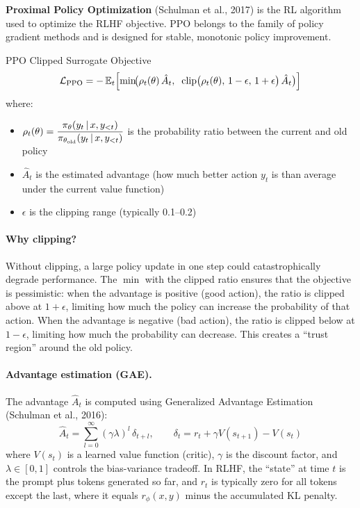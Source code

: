 \textbf{Proximal Policy Optimization} (Schulman et al., 2017) is the RL
algorithm used to optimize the RLHF objective.  PPO belongs to the family
of policy gradient methods and is designed for stable, monotonic policy
improvement.

\begin{mathresult}{PPO Clipped Surrogate Objective}
\begin{equation}
\mathcal{L}_{\text{PPO}} = -\operatorname{\mathbb{E}}_t \Bigl[
  \min\!\bigl(
    \rho_t(\theta)\, \hat{A}_t,\;\;
    \text{clip}\bigl(\rho_t(\theta),\, 1-\epsilon,\, 1+\epsilon\bigr)\, \hat{A}_t
  \bigr)
\Bigr]
\label{eq:ppo}
\end{equation}
where:
\begin{itemize}
\item $\rho_t(\theta) = \dfrac{\pi_\theta(y_t \,|\, x, y_{<t})}
  {\pi_{\theta_{\text{old}}}(y_t \,|\, x, y_{<t})}$ is the probability
  ratio between the current and old policy
\item $\hat{A}_t$ is the estimated advantage (how much better action $y_t$
  is than average under the current value function)
\item $\epsilon$ is the clipping range (typically 0.1--0.2)
\end{itemize}
\end{mathresult}

\paragraph{Why clipping?}
Without clipping, a large policy update in one step could catastrophically
degrade performance.  The $\min$ with the clipped ratio ensures that the
objective is pessimistic: when the advantage is positive (good action), the
ratio is clipped above at $1 + \epsilon$, limiting how much the policy can
increase the probability of that action.  When the advantage is negative
(bad action), the ratio is clipped below at $1 - \epsilon$, limiting how
much the probability can decrease.  This creates a ``trust region'' around
the old policy.

\paragraph{Advantage estimation (GAE).}
The advantage $\hat{A}_t$ is computed using Generalized Advantage Estimation
(Schulman et al., 2016):
\begin{equation}
\hat{A}_t = \sum_{l=0}^{\infty} (\gamma \lambda)^l \, \delta_{t+l},
\qquad
\delta_t = r_t + \gamma V(s_{t+1}) - V(s_t)
\end{equation}
where $V(s_t)$ is a learned value function (critic), $\gamma$ is the
discount factor, and $\lambda \in [0, 1]$ controls the bias-variance
tradeoff.  In RLHF, the ``state'' at time $t$ is the prompt plus tokens
generated so far, and $r_t$ is typically zero for all tokens except the
last, where it equals $r_\phi(x, y)$ minus the accumulated KL penalty.

